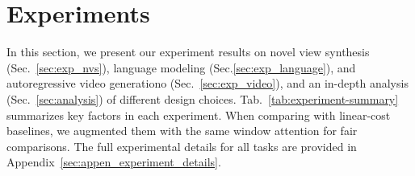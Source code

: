 \documentclass{article}
\begin{document}
        

        

        

        

        

        

        

\section{Experiments} \label{sec:experiments}
\vspace{-0.3em}
In this section, we present our experiment results on novel view synthesis (Sec.~\ref{sec:exp_nvs}),
language modeling (Sec.\ref{sec:exp_language}), and autoregressive video generationo (Sec.~\ref{sec:exp_video}), and an in-depth analysis (Sec.~\ref{sec:analysis}) of different design choices.
Tab.~\ref{tab:experiment-summary} summarizes key factors in each experiment. 
When comparing with linear-cost baselines, we augmented them with the same window attention for fair comparisons. 
The full experimental details for all tasks are provided in Appendix~\ref{sec:appen_experiment_details}.
\vspace{-0.3em}

\begin{table}[t!]
  \caption{Summary of our experiments on three different data structures. `d' denotes model dimension. The state size denotes the size of the fast weight per model block.}

  \centering
  \scriptsize
  \vspace{-0.2in}
  \label{tab:experiment-summary}
\end{table}
\end{document}
